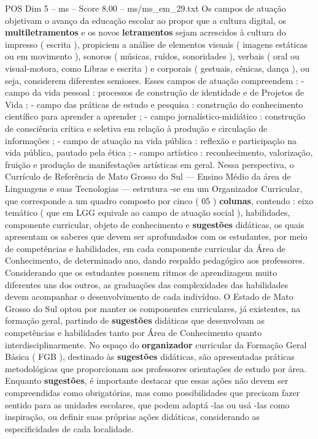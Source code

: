 \begin{textsample}{POS Dim 5 – ms – Score 8.00 – ms/ms\_em\_29.txt}
Os campos de atuação objetivam o avanço da educação escolar ao propor que a cultura digital, os \textbf{multiletramentos} e os novos \textbf{letramentos} sejam acrescidos à cultura do impresso ( escrita ), propiciem a análise de elementos visuais ( imagens estáticas ou em movimento ), sonoros ( músicas, ruídos, sonoridades ), verbais ( oral ou visual-motora, como Libras e escrita ) e corporais ( gestuais, cênicas, dança ), ou seja, considerem diferentes semioses.
Esses campos de atuação compreendem : - campo da vida pessoal : processos de construção de identidade e de Projetos de Vida ; - campo das práticas de estudo e pesquisa : construção do conhecimento científico para aprender a aprender ; - campo jornalístico-midiático : construção de consciência crítica e seletiva em relação à produção e circulação de informações ; - campo de atuação na vida pública : reflexão e participação na vida pública, pautado pela ética ; - campo artístico : reconhecimento, valorização, fruição e produção de manifestações artísticas em geral.
Nessa perspectiva, o Currículo de Referência de Mato Grosso do Sul — Ensino Médio da área de Linguagens e suas Tecnologias — estrutura -se em um Organizador Curricular, que corresponde a um quadro composto por cinco ( 05 ) \textbf{colunas}, contendo : eixo temático ( que em LGG equivale ao campo de atuação social ), habilidades, componente curricular, objeto de conhecimento e \textbf{sugestões} didáticas, os quais apresentam os saberes que devem ser aprofundados com os estudantes, por meio de competências e habilidades, em cada componente curricular da Área de Conhecimento, de determinado ano, dando respaldo pedagógico aos professores.
Considerando que os estudantes possuem ritmos de aprendizagem muito diferentes uns dos outros, as graduações das complexidades das habilidades devem acompanhar o desenvolvimento de cada indivíduo.
O Estado de Mato Grosso do Sul optou por manter os componentes curriculares, já existentes, na formação geral, partindo de \textbf{sugestões} didáticas que desenvolvam as competências e habilidades tanto por Área de Conhecimento quanto interdisciplinarmente.
No espaço do \textbf{organizador} curricular da Formação Geral Básica ( FGB ), destinado às \textbf{sugestões} didáticas, são apresentadas práticas metodológicas que proporcionam aos professores orientações de estudo por área.
Enquanto \textbf{sugestões}, é importante destacar que essas ações não devem ser compreendidas como obrigatórias, mas como possibilidades que precisam fazer sentido para as unidades escolares, que podem adaptá -las ou usá -las como inspiração, ou definir suas próprias ações didáticas, considerando as especificidades de cada localidade.

\end{textsample}
